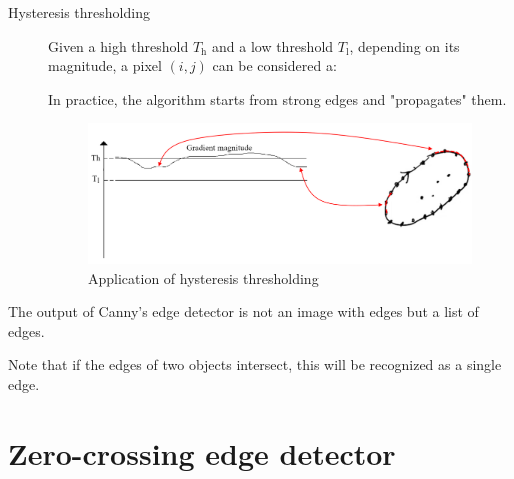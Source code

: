 \begin{description}
    \item[Hysteresis thresholding] 
        Given a high threshold $T_\text{h}$ and a low threshold $T_\text{l}$,
        depending on its magnitude, a pixel $(i, j)$ can be considered a:
        In practice, the algorithm starts from strong edges and "propagates" them.

        \begin{figure}[H]
            \centering
            \includegraphics[width=0.5\linewidth]{./img/hysteresis thresholding.png}
            \caption{Application of hysteresis thresholding}
        \end{figure}
\end{description}

\begin{remark}
    The output of Canny's edge detector is not an image with edges but a list of edges.

    Note that if the edges of two objects intersect, this will be recognized as a single edge.
\end{remark}



\section{Zero-crossing edge detector}

